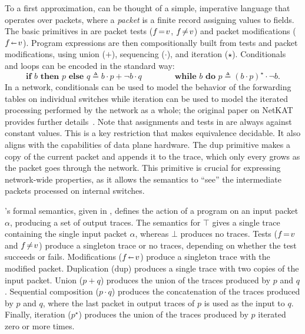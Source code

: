 \documentclass[acmsmall,dvipsnames,nonacm]{acmart}
\begin{document}
To a first approximation, \NetKAT can be thought of a simple,
imperative language that operates over packets, where a \emph{packet}
is a finite record assigning values to fields. The basic primitives in
\NetKAT are packet tests ($f \mathrel{\!=\!} v$, $f \mathrel{\!\neq\!} v$) and packet
modifications ($f\mathrel{\!\shortleftarrow\!} v$). Program expressions are then
compositionally built from tests and packet modifications, using union
($+$), sequencing ($\cdot$), and iteration ($\star$).  Conditionals
and loops can be encoded in the standard way:
\[
\textbf{if } b\textbf{ then } p  \textbf{ else } q \triangleq b \cdot p + \neg b \cdot q \qquad\qquad
\textbf{while } b\textbf{ do } p   \triangleq (b \cdot p)^\star \cdot \neg b.
\]
In a network, conditionals can be used to model the behavior of the
forwarding tables on individual switches while iteration can be used
to model the iterated processing performed by the network as a whole;
the original paper on NetKAT provides further
details~\cite{Anderson2014}. Note that assignments and tests in
\NetKAT are always against constant values.  This is a key restriction
that makes equivalence decidable. It also aligns with the capabilities
of data plane hardware. The $\text{dup}$ primitive makes a copy of the
current packet and appends it to the trace, which only every grows as
the packet goes through the network. This primitive is crucial for
expressing network-wide properties, as it allows the semantics to
``see'' the intermediate packets processed on internal switches.

\NetKAT's formal semantics, given in , defines the
action of a program on an input packet $\alpha$, producing a set of
output traces.  The semantics for $\top$ gives a single trace
containing the single input packet $\alpha$, whereas $\bot$ produces
no traces.  Tests ($f \mathrel{\!=\!} v$ and $f \mathrel{\!\neq\!} v$) produce a singleton
trace or no traces, depending on whether the test succeeds or fails.
Modifications ($f \mathrel{\!\shortleftarrow\!} v$) produce a singleton trace with the modified
packet.  Duplication ($\text{dup}$) produces a single trace with two
copies of the input packet.  Union ($p + q$) produces the union of the
traces produced by $p$ and $q$.  Sequential composition ($p \cdot q$)
produces the concatenation of the traces produced by $p$ and $q$,
where the last packet in output traces of $p$ is used as the input to
$q$. Finally, iteration ($p^\star$) produces the union of the traces
produced by $p$ iterated zero or more times.
\end{document}
